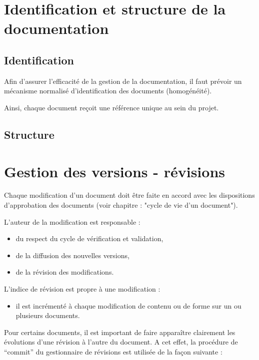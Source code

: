 \documentclass[a4paper]{article}
\begin{document}
\section{Identification et structure de la documentation}

\subsection{Identification}

Afin d’assurer l’efficacité de la gestion de la documentation, il faut prévoir un mécanisme normalisé d’identification des documents (homogénéité).

Ainsi, chaque document reçoit une référence unique au sein du projet.

\subsection{Structure}

\section{Gestion des versions - révisions}

Chaque modification d’un document doit être faite en accord avec les dispositions d’approbation des documents (voir chapitre : "cycle de vie d’un document"). 

L’auteur de la modification est responsable :

\begin{itemize}
\item du respect du cycle de vérification et validation,
\item de la diffusion des nouvelles versions,
\item de la révision des modifications.
\end{itemize}

L'indice de révision est propre à une modification :

\begin{itemize}
\item il est incrémenté à chaque modification de contenu ou de forme sur un ou plusieurs documents.
\end{itemize}

Pour certains documents, il est important de faire apparaître clairement les évolutions d'une révision à l'autre du document. A cet effet, la procédure de ``commit'' du gestionnaire de révisions est utilisée de la façon suivante :
\end{document}
